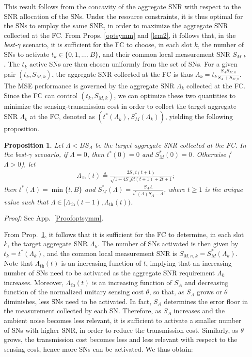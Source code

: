 \documentclass[10pt,twocolumn,twoside]{IEEEtran}
\newtheorem{propos}{Proposition}
\theoremstyle{plain}
\begin{document}
\noindent
This result follows from the concavity of the aggregate SNR with respect to the SNR allocation of the SNs.
Under the resource constraints, it is thus optimal for the SNs to employ the same SNR, in order to maximize the aggregate SNR collected at the FC.
 From Props. \ref{optsymm} and \ref{lem2}, it follows that, in the \emph{best-}$\gamma$ scenario, it is sufficient for the FC to choose, in each slot $k$,
the number of SNs to activate $t_k\in\{0,1,\dots,B\}$, and their common local measurement SNR $S_{M,k}$. The $t_k$ active SNs
are then chosen uniformly from the set of SNs.
For a given pair $(t_k,S_{M,k})$,
the aggregate SNR collected at the FC is thus $\Lambda_k=t_k\frac{S_AS_{M,k}}{S_A+S_{M,k}}$.
The MSE performance is governed by the aggregate SNR $\Lambda_k$ collected at the FC. Since the FC 
can control $(t_k,S_{M,k})$, we can optimize these two quantities to minimize the sensing-transmission cost
in order to collect the target aggregate SNR $\Lambda_k$ at the FC,
denoted as $(t^*(\Lambda_k),S_{M}^*(\Lambda_k))$,
 yielding the following proposition.
\begin{propos}
\label{lem3}
Let $\Lambda{<}BS_A$ be the target aggregate SNR collected at the FC.
In the \emph{best-}$\gamma$ scenario,
if $\Lambda{=}0$, then $t^*(0){=}0$ and $S_{M}^*(0)=0$.
Otherwise ($\Lambda>0$), let
\begin{align*}
\Lambda_{\mathrm{th}}(t)\triangleq\frac{2S_At(t+1)}
{\sqrt{1+4S_A\theta t(t+1)}+2t+1};
\end{align*}
then $t^*(\Lambda){=}\min\{t,B\}$
and $S_{M}^*(\Lambda)=\frac{S_A\Lambda}{t^*(\Lambda)S_A-\Lambda}$, where $t{\geq}1$ is the unique value such that $\Lambda\in[\Lambda_{\mathrm{th}}(t-1),\Lambda_{\mathrm{th}}(t))$.
\end{propos}
\noindent\emph{Proof:}
See App.~\ref{Proofoptsymm}.
\hfill\QED

\noindent From Prop.~\ref{lem3}, it follows that it is sufficient for the FC to determine, in each slot $k$,
the target aggregate SNR $\Lambda_k$. The number of SNs activated is then given by $t_k=t^*(\Lambda_k)$,
 and the common local measurement SNR is $S_{M,n,k}=S_{M}^*(\Lambda_k)$.
  Note that $\Lambda_{\mathrm{th}}(t)$ is an increasing function of $t$, implying that an increasing number of SNs need to be activated 
as the aggregate SNR requirement $\Lambda_k$ increases.
Moreover, $\Lambda_{\mathrm{th}}(t)$ is an increasing function of $S_A$ 
and decreasing function of the normalized unitary sensing cost $\theta$, so that, as $S_A$ grows or $\theta$ diminishes,
less SNs need to be activated.
In fact, $S_A$ determines the error floor in the measurement collected by each SN. 
Therefore, as $S_A$ increases and the ambient noise becomes less relevant, it is sufficient to activate 
a smaller number of SNs with higher SNR, in order to reduce the transmission cost.
Similarly, as $\theta$ grows, the
transmission cost becomes less and less relevant with respect to the sensing cost, hence
more SNs can be activated.
We thus obtain:
\end{document}
